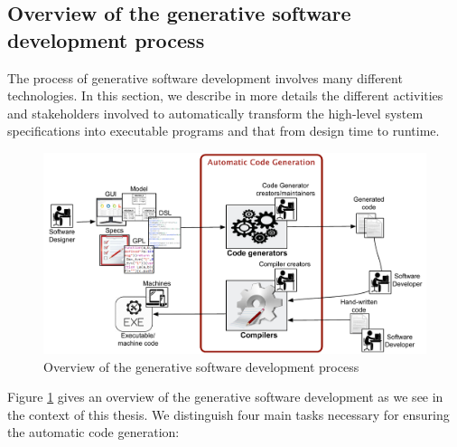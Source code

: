 

\subsection{Overview of the generative software development process}
The process of generative software development involves many different technologies. In this section, we describe in more details the different activities and stakeholders involved to automatically transform the high-level system specifications into executable programs and that from design time to runtime.
\begin{figure}[h]
	\center
	\includegraphics[scale=0.65]{Background/fig/background_overview2.pdf}
	\caption{Overview of the generative software development process}
	\label{fig:background_overview2}
\end{figure}
Figure \ref{fig:background_overview2} gives an overview of the generative software development as we see in the context of this thesis. We distinguish four main tasks necessary for ensuring the automatic code generation: 



